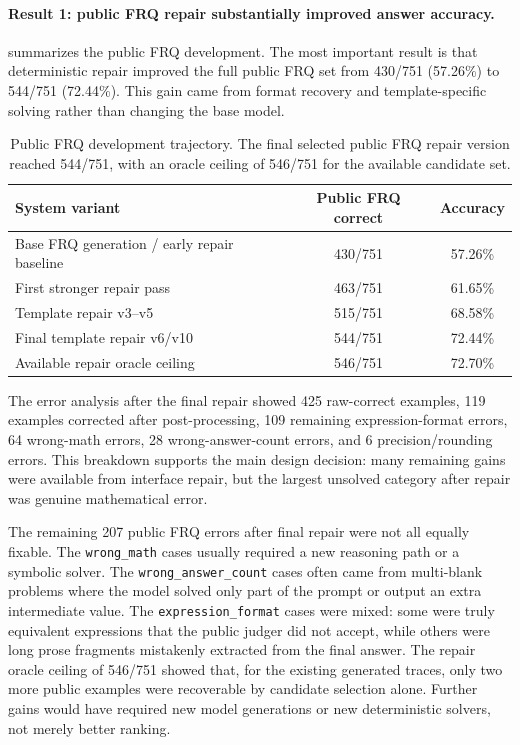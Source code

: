 \documentclass{article}
\begin{document}
\paragraph{Result 1: public FRQ repair substantially improved answer accuracy.}
 summarizes the public FRQ development. The most important result is that deterministic repair improved the full public FRQ set from 430/751 (57.26\%) to 544/751 (72.44\%). This gain came from format recovery and template-specific solving rather than changing the base model.

\begin{table}[h]
\caption{Public FRQ development trajectory. The final selected public FRQ repair version reached 544/751, with an oracle ceiling of 546/751 for the available candidate set.}
\label{tab:frq_progress}
\centering
\begin{tabular}{lcc}
\toprule
System variant & Public FRQ correct & Accuracy \\
\midrule
Base FRQ generation / early repair baseline & 430/751 & 57.26\% \\
First stronger repair pass & 463/751 & 61.65\% \\
Template repair v3--v5 & 515/751 & 68.58\% \\
Final template repair v6/v10 & 544/751 & 72.44\% \\
Available repair oracle ceiling & 546/751 & 72.70\% \\
\bottomrule
\end{tabular}
\end{table}

The error analysis after the final repair showed 425 raw-correct examples, 119 examples corrected after post-processing, 109 remaining expression-format errors, 64 wrong-math errors, 28 wrong-answer-count errors, and 6 precision/rounding errors. This breakdown supports the main design decision: many remaining gains were available from interface repair, but the largest unsolved category after repair was genuine mathematical error.

The remaining 207 public FRQ errors after final repair were not all equally fixable. The \texttt{wrong\_math} cases usually required a new reasoning path or a symbolic solver. The \texttt{wrong\_answer\_count} cases often came from multi-blank problems where the model solved only part of the prompt or output an extra intermediate value. The \texttt{expression\_format} cases were mixed: some were truly equivalent expressions that the public judger did not accept, while others were long prose fragments mistakenly extracted from the final answer. The repair oracle ceiling of 546/751 showed that, for the existing generated traces, only two more public examples were recoverable by candidate selection alone. Further gains would have required new model generations or new deterministic solvers, not merely better ranking.
\end{document}
